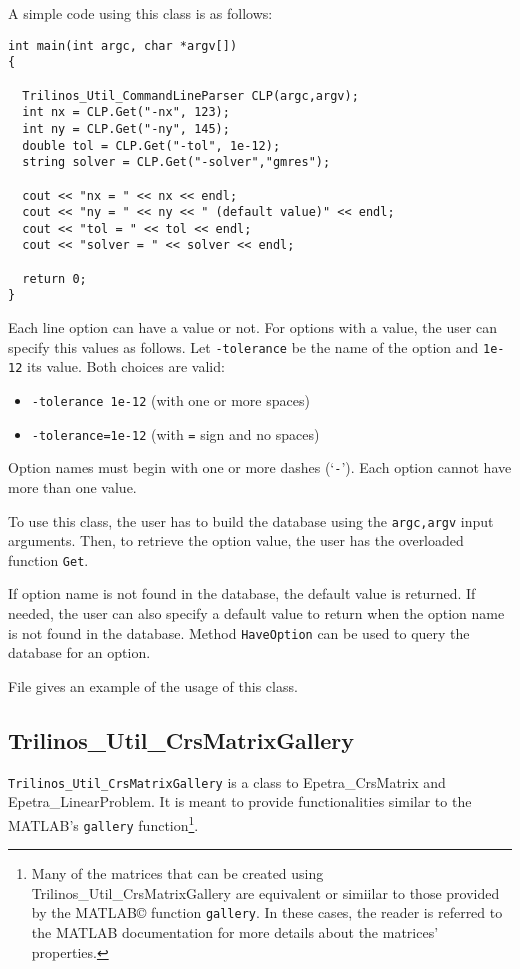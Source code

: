 A simple code using this class is as follows:
\begin{verbatim}
int main(int argc, char *argv[])
{

  Trilinos_Util_CommandLineParser CLP(argc,argv);
  int nx = CLP.Get("-nx", 123);
  int ny = CLP.Get("-ny", 145);
  double tol = CLP.Get("-tol", 1e-12);
  string solver = CLP.Get("-solver","gmres");

  cout << "nx = " << nx << endl;
  cout << "ny = " << ny << " (default value)" << endl;
  cout << "tol = " << tol << endl;
  cout << "solver = " << solver << endl;

  return 0;
}
\end{verbatim}

Each line   option can have a value or not. For options with a value,
the user can specify this values as follows. Let \verb!-tolerance! be the
name of the option and \verb!1e-12! its value. Both choices are valid:
\begin{itemize}
\item \verb!-tolerance 1e-12! (with one or more spaces)
\item \verb!-tolerance=1e-12! (with \verb!=! sign and no spaces)
\end{itemize}

Option names must begin with one or more dashes (`\verb!-!'). Each option
cannot have more than one value.

To use this class, the user has to build the database using the
\verb!argc,argv! input arguments. Then, to retrieve the option value,
the user has the overloaded function \verb!Get!.
 
If option name is not found in the database, the default value is
returned. If needed, the user can also specify a default value to return
when the option name is not found in the database. Method
\verb!HaveOption! can be used to query the database for an option.

File  gives an example of the usage of this class.
 

\subsection{Trilinos\_Util\_CrsMatrixGallery}
\label{sec:triutils:gallery}

\verb!Trilinos_Util_CrsMatrixGallery! is a class to Epetra\_CrsMatrix
and Epetra\_LinearProblem. It is meant to provide functionalities
similar to the MATLAB's \verb!gallery! function\footnote{Many of the
  matrices that can be created using Trilinos\_Util\_CrsMatrixGallery
  are equivalent or simiilar to those provided by the MATLAB\copyright
  function {\tt gallery}. In these cases, the reader is referred to the
  MATLAB documentation for more details about the matrices'
  properties.}.

